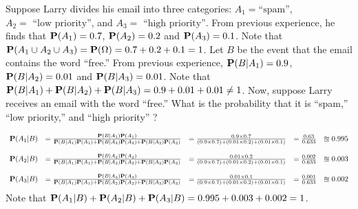 \begin{example}[Wasserman2003~p.12]\label{Wasserman2003p12}
Suppose Larry divides his email into three categories: $A_1 = \text{``spam''}$, $A_2 =\text{ ``low priority''}$, and $A_3 = \text{ ``high priority''}$.  From previous experience, he finds that $\mathbf{P}(A_1) = 0.7$, $\mathbf{P}(A_2) = 0.2$ and $\mathbf{P}(A_3)=0.1$.  Note that $\mathbf{P}(A_1 \cup A_2 \cup A_3) = \mathbf{P}(\Omega) = 0.7+0.2+0.1 = 1$.  Let $B$ be the event that the email contains the word ``free.''  From previous experience, $\mathbf{P}(B|A_1) = 0.9$, $\mathbf{P}(B|A_2) = 0.01$ and $\mathbf{P}(B|A_3)=0.01$.  Note that $\mathbf{P}(B|A_1) + \mathbf{P}(B|A_2) + \mathbf{P}(B|A_3) = 0.9+0.01+0.01 \neq 1$.  Now, suppose Larry receives an email with the word ``free.''  What is the probability that it is ``spam,'' ``low priority,''  and ``high priority'' ?

{\scriptsize{
\[
\begin{array}{l l l l l}
\mathbf{P}(A_1 | B) 
&= \frac{\mathbf{P}(B|A_1)\mathbf{P}(A_1)}{\mathbf{P}(B|A_1)\mathbf{P}(A_1)+\mathbf{P}(B|A_2)\mathbf{P}(A_2)+\mathbf{P}(B|A_3)\mathbf{P}(A_3)} 
&= \frac{0.9 \times 0.7}{(0.9 \times 0.7)+ (0.01 \times 0.2) + (0.01 \times 0.1)}
&= \frac{0.63}{0.633}
&\approxeq 0.995 \\
\\
\mathbf{P}(A_2 | B) 
&= \frac{\mathbf{P}(B|A_2)\mathbf{P}(A_2)}{\mathbf{P}(B|A_1)\mathbf{P}(A_1)+\mathbf{P}(B|A_2)\mathbf{P}(A_2)+\mathbf{P}(B|A_3)\mathbf{P}(A_3)} 
&= \frac{0.01 \times 0.2}{(0.9 \times 0.7)+ (0.01 \times 0.2) + (0.01 \times 0.1)}
&= \frac{0.002}{0.633}
&\approxeq 0.003 \\
\\
\mathbf{P}(A_3 | B) 
&= \frac{\mathbf{P}(B|A_3)\mathbf{P}(A_3)}{\mathbf{P}(B|A_1)\mathbf{P}(A_1)+\mathbf{P}(B|A_2)\mathbf{P}(A_2)+\mathbf{P}(B|A_3)\mathbf{P}(A_3)} 
&= \frac{0.01 \times 0.1}{(0.9 \times 0.7)+ (0.01 \times 0.2) + (0.01 \times 0.1)}
&= \frac{0.001}{0.633}
&\approxeq 0.002 \\
\end{array}
\]
Note that $\mathbf{P}(A_1|B) + \mathbf{P}(A_2|B)+\mathbf{P}(A_3|B) = 0.995+0.003+0.002=1$.
}}
\end{example}

